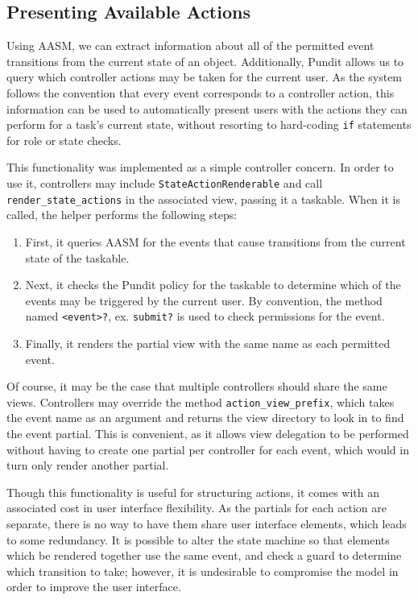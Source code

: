 \FloatBarrier

\subsection {Presenting Available Actions}

Using AASM, we can extract information about all of the permitted event transitions from the current state of an object. Additionally, Pundit allows us to query which controller actions may be taken for the current user. As the system follows the convention that every event corresponds to a controller action, this information can be used to automatically present users with the actions they can perform for a task's current state, without resorting to hard-coding \verb!if! statements for role or state checks.

This functionality was implemented as a simple controller concern. In order to use it, controllers may include \verb!StateActionRenderable! and call 
\verb!render_state_actions! in the associated view, passing it a taskable. When it is called, the helper performs the following steps:
\begin{enumerate}
\item First, it queries AASM for the events that cause transitions from the current state of the taskable.
\item Next, it checks the Pundit policy for the taskable to determine which of the events may be triggered by the current user. By convention, the method named \verb!<event>?!, ex. \verb!submit?! is used to check permissions for the event.
\item Finally, it renders the partial view with the same name as each permitted event.
\end{enumerate}

Of course, it may be the case that multiple controllers should share the same views. Controllers may override the method \verb!action_view_prefix!, which takes the event name as an argument and returns the view directory to look in to find the event partial. This is convenient, as it allows view delegation to be performed without having to create one partial per controller for each event, which would in turn only render another partial.

Though this functionality is useful for structuring actions, it comes with an associated cost in user interface flexibility. As the partials for each action are separate, there is no way to have them share user interface elements, which leads to some redundancy. It is possible to alter the state machine so that elements which be rendered together use the same event, and check a guard to determine which transition to take; however, it is undesirable to compromise the model in order to improve the user interface. 
